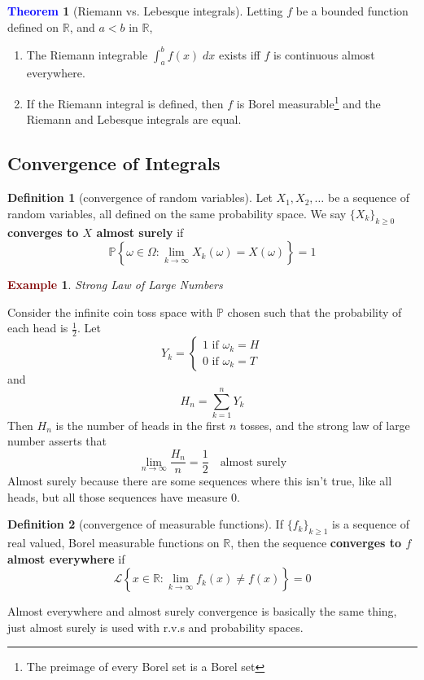\documentclass[11pt]{article}
\theoremstyle{definition}
\theoremstyle{definition}
\newcommand{\R}[0]{\mathbb{R}}
\newtheorem{theorem}{\textcolor{blue}{Theorem}}
\theoremstyle{definition}
\newtheorem{definition}{\textcolor{OliveGreen}{Definition}}
\newtheorem{ex}{\textcolor{Maroon}{Example}}
\theoremstyle{remark}
\begin{document}
\begin{theorem}[Riemann vs. Lebesque integrals]
    Letting $f$ be a bounded function defined on $\R$, and $a < b$ in $\R$,
    \begin{enumerate}
        \item The Riemann integrable $\int_a^b f(x) \; dx$ exists iff $f$ is continuous almost everywhere.
        \item If the Riemann integral is defined, then $f$ is Borel measurable\footnote{The preimage of every Borel set is a Borel set} and the Riemann
        and Lebesque integrals are equal.
    \end{enumerate}    
\end{theorem}

\subsection{Convergence of Integrals}

\begin{definition}[convergence of random variables]
    Let $X_1, X_2, \dots$ be a sequence of random variables, all defined on the same probability space.
    We say $\{X_k\}_{k \geq 0}$ \textbf{converges to $X$ almost surely} if
    \[
    \mathbb{P}\left\{\omega \in \Omega : \lim_{k \to \infty} X_k(\omega) = X(\omega) \right\} = 1
    \]
\end{definition}

\begin{ex}\textit{Strong Law of Large Numbers}

    
    Consider the infinite coin toss space with $\mathbb{P}$ chosen such that the probability of each head is $\frac{1}{2}$.
    Let
    \[
        Y_k = \begin{cases}
            1 \text{ if } \omega_k = H \\
            0 \text{ if } \omega_k = T
        \end{cases}
    \]   
    and
    \[
        H_n = \sum_{k = 1}^n Y_k
    \] 
    Then $H_n$ is the number of heads in the first $n$ tosses, and the strong law of large number asserts that
    \[
        \lim_{n \to \infty} \frac{H_n}{n} = \frac{1}{2} \quad \text{almost surely}
    \]   
    Almost surely because there are some sequences where this isn't true, like all heads, but all those sequences
    have measure $0$.
\end{ex}

\begin{definition}[convergence of measurable functions]
    If $\{f_k\}_{k \geq 1}$ is a sequence of real valued, Borel measurable functions on $\R$, then the sequence
    \textbf{converges to $f$ almost everywhere} if 
    \[
    \mathcal{L}\left\{x \in \R : \lim_{k \to \infty} f_k(x) \neq f(x) \right\} = 0
    \]
\end{definition}
Almost everywhere and almost surely convergence is basically the same thing, just almost surely is used with
r.v.s and probability spaces.
\end{document}
